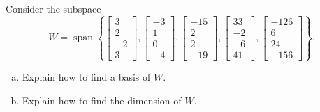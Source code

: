 
\begin{exerciseStatement}


Consider the subspace \[W=\operatorname{span}  \left\{ \left[\begin{array}{c}
3 \\
2 \\
-2 \\
3
\end{array}\right] , \left[\begin{array}{c}
-3 \\
1 \\
0 \\
-4
\end{array}\right] , \left[\begin{array}{c}
-15 \\
2 \\
2 \\
-19
\end{array}\right] , \left[\begin{array}{c}
33 \\
-2 \\
-6 \\
41
\end{array}\right] , \left[\begin{array}{c}
-126 \\
6 \\
24 \\
-156
\end{array}\right] \right\} .\]


\begin{enumerate}[(a)]
\item  Explain how to find a basis of \(W\).
\item  Explain how to find the dimension of \(W\).
\end{enumerate}
    
\end{exerciseStatement}
    
